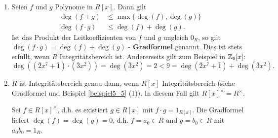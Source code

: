 \begin{rem}\label{rem5_9}
	\begin{enumerate}[label=(\roman*)]
		\item Seien $f$ und $g$ Polynome in $R[x]$. Dann gilt
		\begin{align*}
			\deg(f + g) &\leq \max\{\deg(f), \deg(g)\}\\
			\deg(f\cdot g) &\leq \deg(f) + \deg(g).
		\end{align*}
		Ist das Produkt der Leitkoeffizienten von $f$ und $g$ ungleich $0_R$, so gilt $\deg(f\cdot g) = \deg(f) + \deg(g)$ - \textbf{Gradformel} genannt.
		Dies ist stets erfüllt, wenn $R$ Integritätsbereich ist. Andererseits gilt zum Beispiel in $\mathbb{Z}_6 [x]$:
		\[\deg((\bar{2}x^7 + \bar{1})\cdot(\bar{3}x^2)) = \deg(\bar{3}x^2) = 2 < 9 = \deg(\bar{2}x^7 + \bar{1}) + \deg(\bar{3}x^2).\]
		\item $R$ ist Integritätsbereich genau dann, wenn $R[x]$ Integritätsbereich (siehe Gradformel und Beispiel \ref{beispiel5_5} (1)). In diesem Fall gilt $R[x]^\times = R^\times$.
		\begin{inlproof}
			Sei $f \in R[x]^\times$, d.h. es existiert $g \in R[x]$ mit $f \cdot g = 1_{R[x]}$. Die Gradformel liefert $\deg(f) = \deg(g) = 0$, d.h. $f = a_0 \in R$ und $g = b_0 \in R$ mit $a_0 b_0 = 1_R$.
		\end{inlproof} 
	\end{enumerate}
\end{rem}

